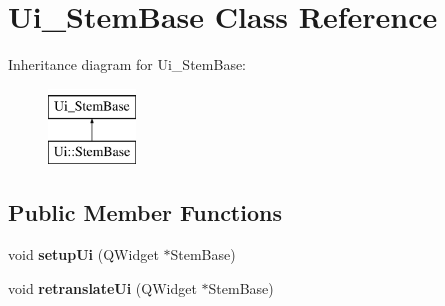 \hypertarget{class_ui___stem_base}{}\section{Ui\+\_\+\+Stem\+Base Class Reference}
\label{class_ui___stem_base}
Inheritance diagram for Ui\+\_\+\+Stem\+Base\+:\begin{figure}[H]
\begin{center}
\leavevmode
\includegraphics[height=2.000000cm]{class_ui___stem_base}
\end{center}
\end{figure}
\subsection*{Public Member Functions}
\begin{DoxyCompactItemize}
\item 
\mbox{\label{class_ui___stem_base_a2f7131deb47bb7bae5449628bea76ad7}} 
void {\bfseries setup\+Ui} (Q\+Widget $\ast$Stem\+Base)
\item 
\mbox{\label{class_ui___stem_base_ad3df8d761c114264c45f497209a7754c}} 
void {\bfseries retranslate\+Ui} (Q\+Widget $\ast$Stem\+Base)
\end{DoxyCompactItemize}
